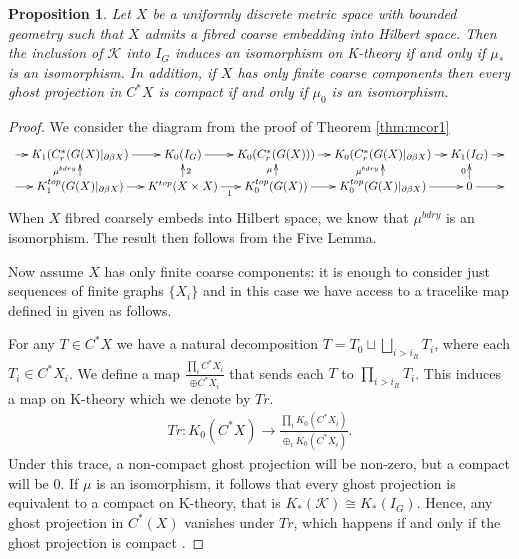 \documentclass[11pt]{amsart}
\theoremstyle{plain}
\newtheorem{proposition}[theorem]{Proposition}%
\theoremstyle{definition}%
\theoremstyle{remark}%
\begin{document}
{\begin{proposition}\label{thm:MT2}
Let $X$ be a uniformly discrete metric space with bounded geometry such that $X$ admits a fibred coarse embedding into Hilbert space. Then the inclusion of $\mathcal{K}$ into $I_{G}$ induces an isomorphism on K-theory if and only if $\mu_{*}$ is an isomorphism. In addition, if $X$ has only finite coarse components then every ghost projection in $C^{*}X$ is compact if and only if $\mu_{0}$ is an isomorphism.
\end{proposition}
\begin{proof}
We consider the diagram from the proof of Theorem \ref{thm:mcor1}
$$
\xymatrix@=1em{
\ar[r] & K_{1}(C^{*}_{r}(G(X)|_{\partial\beta X}) \ar[r] & K_{0}(I_{G}) \ar[r]& K_{0}(C^{*}_{r}(G(X))) \ar[r]& K_{0}(C^{*}_{r}(G(X)|_{\partial\beta X})\ar[r] & K_{1}(I_{G}) \ar[r] & \\
\ar[r] & K_{1}^{top}(G(X)|_{\partial\beta X}) \ar[r] \ar[u]^{\mu^{bdry}}& K^{top}(X \times X) \ar[r]_{1}\ar[u]_{2}& K_{0}^{top}(G(X)) \ar[r]\ar[u]^{\mu}& K_{0}^{top}(G(X)|_{\partial\beta X}) \ar[r]\ar[u]^{\mu^{bdry}}& 0\ar[u]^{0} \ar[r] &
}
$$
When $X$ fibred coarsely embeds into Hilbert space, we know that $\mu^{bdry}$ is an isomorphism. The result then follows from the Five Lemma.

Now assume $X$ has only finite coarse components: it is enough to consider just sequences of finite graphs $\lbrace X_{i}\rbrace$ and in this case we have access to a tracelike map defined in \cite{higsonpreprint, explg1} given as follows.

For any $T \in C^{*}X$ we have a natural decomposition $T= T_{0} \sqcup \bigsqcup_{i>i_{R}}T_{i}$, where each $T_{i} \in C^{*}X_{i}$. We define a map $\frac{\prod_{i}C^{*}X_{i}}{\oplus C^{*}X_{i}}$ that sends each $T$ to $\prod_{i>i_{R}} T_{i}$. This induces a map on K-theory which we denote by $Tr$.
\begin{eqnarray*}
Tr:K_{0}(C^{*}X) \rightarrow \frac{\prod_{i}K_{0}(C^{*}X_{i})}{\oplus_{i}K_{0}(C^{*}X_{i})}.
\end{eqnarray*}
Under this trace, a non-compact ghost projection will be non-zero, but a compact will be $0$. If $\mu$ is an isomorphism, it follows that every ghost projection is equivalent to a compact on K-theory, that is $K_{*}(\mathcal{K}) \cong K_{*}(I_{G})$. Hence, any ghost projection in $C^{*}(X)$ vanishes under $Tr$, which happens if and only if the ghost projection is compact \cite{explg1}.
\end{proof}

}
\end{document}
